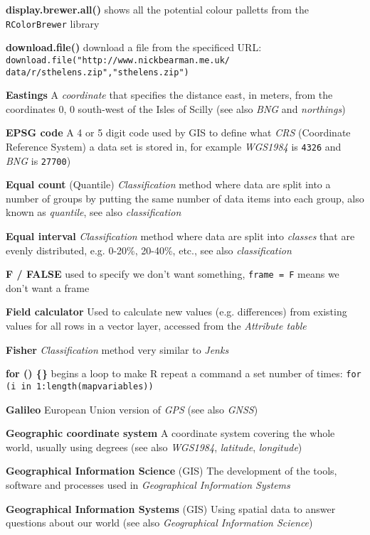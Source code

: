\documentclass[a4paper,10pt]{article}
\begin{document}
\begin{multicols}{2}
\textbf{display.brewer.all()} shows all the potential colour palletts from the \texttt{RColorBrewer} library

\textbf{download.file()} download a file from the specificed URL: \texttt{download.file("http://www.nickbearman.me.uk/
data/r/sthelens.zip","sthelens.zip")}

\textbf{Eastings} A \textit{coordinate} that specifies the distance east, in meters, from the coordinates 0, 0 south-west of the Isles of Scilly (see also \textit{BNG} and \textit{northings})

\textbf{EPSG code} A 4 or 5 digit code used by GIS to define what \textit{CRS} (Coordinate Reference System) a data set is stored in, for example \textit{WGS1984} is \texttt{4326} and \textit{BNG} is \texttt{27700})

\textbf{Equal count} (Quantile) \textit{Classification} method where data are split into a number of groups by putting the same number of data items into each group, also known as \textit{quantile}, see also \textit{classification}

\textbf{Equal interval} \textit{Classification} method where data are split into \textit{classes} that are evenly distributed, e.g. 0-20\%, 20-40\%, etc., see also \textit{classification} 

\textbf{F / FALSE} used to specify we don't want something, \texttt{frame = F} means we don't want a frame

\textbf{Field calculator} Used to calculate new values (e.g. differences) from existing values for all rows in a vector layer, accessed from the \textit{Attribute table} 

\textbf{Fisher} \textit{Classification} method very similar to \textit{Jenks} 

\textbf{for () \{\}} begins a loop to make R repeat a command a set number of times: \texttt {for (i in 1:length(mapvariables))}

\textbf{Galileo} European Union version of \textit{GPS} (see also \textit{GNSS})

\textbf{Geographic coordinate system} A coordinate system covering the whole world, usually using degrees (see also \textit{WGS1984}, \textit{latitude}, \textit{longitude})

\textbf{Geographical Information Science} (GIS) The development of the tools, software and processes used in \textit{Geographical Information Systems} 

\textbf{Geographical Information Systems} (GIS) Using spatial data to answer questions about our world (see also \textit{Geographical Information Science})


\end{multicols}
\end{document}
